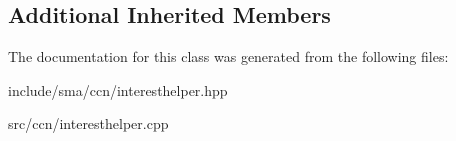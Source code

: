 \subsection*{Additional Inherited Members}


The documentation for this class was generated from the following files\-:\begin{DoxyCompactItemize}
\item 
include/sma/ccn/interesthelper.\-hpp\item 
src/ccn/interesthelper.\-cpp\end{DoxyCompactItemize}
